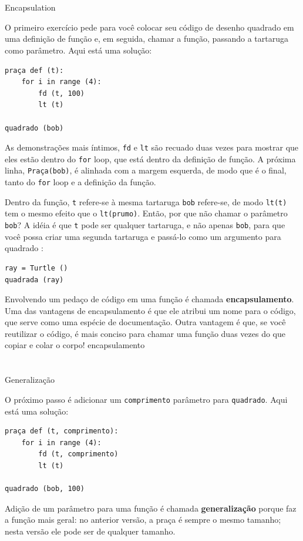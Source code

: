 \documentclass[10pt]{book}
\begin{document}
\section{} Encapsulation

O primeiro exercício pede para você colocar seu código de desenho quadrado
em uma definição de função e, em seguida, chamar a função, passando
a tartaruga como parâmetro. Aqui está uma solução:

\begin{verbatim}
praça def (t):
    for i in range (4):
        fd (t, 100)
        lt (t)

quadrado (bob)
\end{verbatim}
%
As demonstrações mais íntimos, {\tt fd} e {\tt lt} são
recuado duas vezes para mostrar que eles estão dentro do {\tt for} loop,
que está dentro da definição de função. A próxima linha,
{\tt Praça(bob)}, é alinhada com a margem esquerda, de modo que é o
final, tanto do {\tt for} loop e a definição da função.

Dentro da função, {\tt t} refere-se à mesma tartaruga {\tt bob}
refere-se, de modo {\tt lt(t)} tem o mesmo efeito que o {\tt lt(prumo)}.
Então, por que não chamar o parâmetro {\tt bob}? A idéia é que {\tt t}
pode ser qualquer tartaruga, e não apenas {\tt bob}, para que você possa criar
uma segunda tartaruga e passá-lo como um argumento para {quadrado \tt}:

\begin{verbatim}
ray = Turtle ()
quadrada (ray)
\end{verbatim}
%
Envolvendo um pedaço de código em uma função é chamada {\bf
encapsulamento}. Uma das vantagens de encapsulamento é que ele
atribui um nome para o código, que serve como uma espécie de documentação.
Outra vantagem é que, se você reutilizar o código, é mais conciso
para chamar uma função duas vezes do que copiar e colar o corpo!
\index{} encapsulamento


\section{} Generalização

O próximo passo é adicionar um {\tt comprimento} parâmetro para {\tt quadrado}.
Aqui está uma solução:

\begin{verbatim}
praça def (t, comprimento):
    for i in range (4):
        fd (t, comprimento)
        lt (t)

quadrado (bob, 100)
\end{verbatim}
%
Adição de um parâmetro para uma função é chamada {\bf generalização}
porque faz a função mais geral: no anterior
versão, a praça é sempre o mesmo tamanho; nesta versão
ele pode ser de qualquer tamanho.
\end{document}
